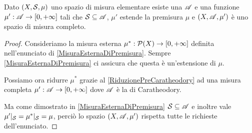 \begin{theorem}\label{EstensioneCaratheodory}
	Dato $(X,\S,\mu)$ uno spazio di misura elementare esiste una \sigalg{} $\A$ e una funzione $\mu':\A\to\Rpiu$ tali che $\S\subseteq \A$, $\mu'$ estende la premisura $\mu$ e $(X,\A,\mu')$ è uno spazio di misura completo.
\end{theorem}
\begin{proof}
	Consideriamo la misura esterna $\mu^*:\mathcal P(X)\to\Rpiu$ definita nell'enunciato di \cref{MisuraEsternaDiPremisura}. Sempre \cref{MisuraEsternaDiPremisura} ci assicura che questa è un'estensione di $\mu$.
	
	Possiamo ora ridurre $\mu^*$ grazie al \cref{RiduzionePreCaratheodory} ad una misura completa $\mu':\A\to\Rpiu$ dove $\A$ è la \sigalg{} di Caratheodory. 
	
	Ma come dimostrato in \cref{MisuraEsternaDiPremisura} $\S\subseteq\A$ e inoltre vale $\mu'|_\S=\mu^*|_\S=\mu$, perciò lo spazio $(X,\A,\mu')$ rispetta tutte le richieste dell'enunciato.
\end{proof}


